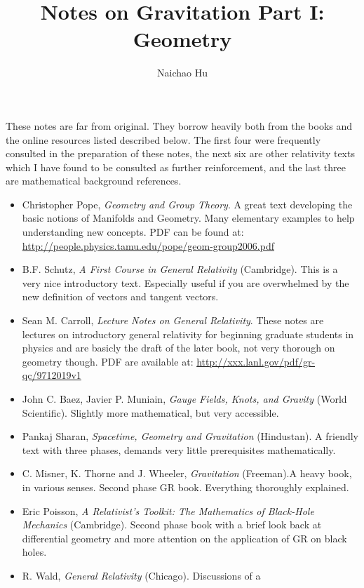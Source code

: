 \documentclass[a4paper,11pt]{article}
\title{\boldmath Notes on Gravitation Part I: Geometry}
\author{Naichao Hu}
\affiliation{Department of Physics,\\Sun Yat-sen University}
\theoremstyle{remark}
\begin{document}
 
\maketitle
\flushbottom


\clearpage

\acknowledgments
These notes are far from original. They borrow heavily both from the books 
and the online resources listed described below. 
The first four were frequently consulted in the preparation of these
notes, the next six are other relativity texts which I have found to
be consulted as further reinforcement, and the last three 
are mathematical background references.
\begin{itemize}
\item Christopher Pope, \textit{Geometry and Group Theory}. A great
  text developing the basic notions of Manifolds and Geometry. Many
  elementary examples to help understanding new concepts. PDF can be
  found at:
  \url{http://people.physics.tamu.edu/pope/geom-group2006.pdf}
\item B.F. Schutz, \textit{A First Course in General Relativity}
  (Cambridge). This is a very nice introductory text. Especially
  useful if you are overwhelmed by the new definition of vectors and
  tangent vectors.
\item Sean M. Carroll, \textit{Lecture Notes on General
    Relativity}. These notes are lectures on introductory general
  relativity for beginning graduate students in physics and are
  basicly the draft of the later book, not very thorough on geometry
  though. PDF are available at:
  \url{http://xxx.lanl.gov/pdf/gr-qc/9712019v1}  
\item John C. Baez, Javier P. Muniain, \textit{Gauge Fields, Knots,
    and Gravity} (World Scientific). Slightly more mathematical, but
  very accessible.
\item Pankaj Sharan, \textit{Spacetime, Geometry and Gravitation}
  (Hindustan). A friendly text with three phases, demands very little
  prerequisites mathematically.
\item C. Misner, K. Thorne and J. Wheeler, \textit{Gravitation}
  (Freeman).A heavy book, in various senses. Second phase GR
  book. Everything thoroughly explained.
\item Eric Poisson, \textit{A Relativist's Toolkit: The Mathematics of
    Black-Hole Mechanics} (Cambridge). Second phase book with a brief
  look back at differential geometry and more attention on the
  application of GR on black holes.
\item R. Wald, \textit{General Relativity} (Chicago). Discussions of a

\end{itemize}
\end{document}
